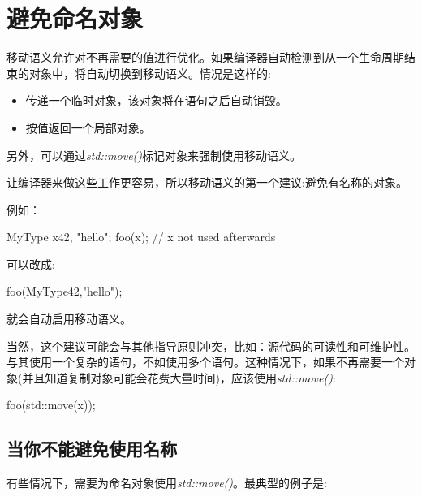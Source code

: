 \section{避免命名对象}
移动语义允许对不再需要的值进行优化。如果编译器自动检测到从一个生命周期结束的对象中，将自动切换到移动语义。情况是这样的:

\begin{itemize}
	\item 传递一个临时对象，该对象将在语句之后自动销毁。
	\item 按值返回一个局部对象。
\end{itemize}

另外，可以通过\textit{std::move()}标记对象来强制使用移动语义。

让编译器来做这些工作更容易，所以移动语义的第一个建议:避免有名称的对象。

例如：

\begin{cppcode}
MyType x{42, "hello"};
foo(x); // x not used afterwards
\end{cppcode}

可以改成:

\begin{cppcode}
foo(MyType{42,"hello"});
\end{cppcode}

就会自动启用移动语义。

当然，这个建议可能会与其他指导原则冲突，比如：源代码的可读性和可维护性。与其使用一个复杂的语句，不如使用多个语句。这种情况下，如果不再需要一个对象(并且知道复制对象可能会花费大量时间)，应该使用\textit{std::move()}:

\begin{cppcode}
foo(std::move(x));
\end{cppcode}

\subsection{当你不能避免使用名称}

有些情况下，需要为命名对象使用\textit{std::move()}。最典型的例子是:

